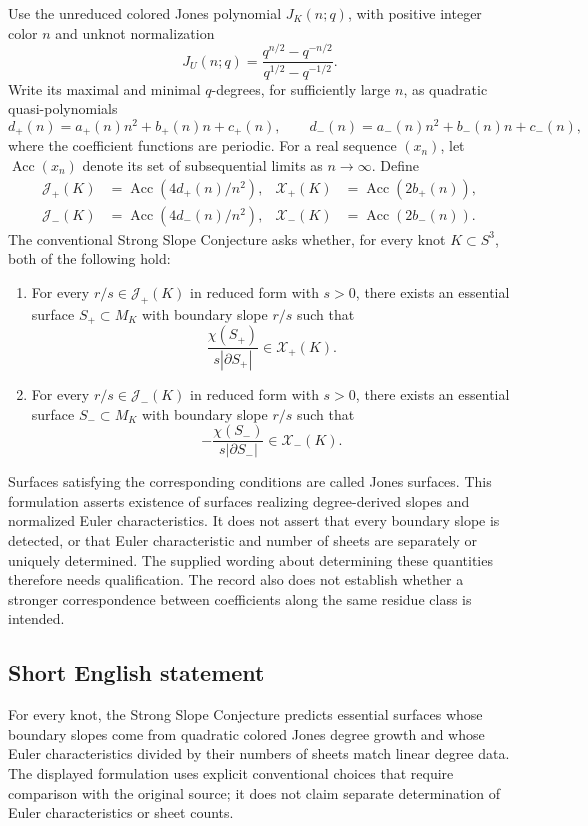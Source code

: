 \documentclass[11pt]{article}
\begin{document}
Use the unreduced colored Jones polynomial \(J_K(n;q)\), with positive integer color \(n\) and unknot normalization
\[
J_U(n;q)=\frac{q^{n/2}-q^{-n/2}}{q^{1/2}-q^{-1/2}}.
\]
Write its maximal and minimal \(q\)-degrees, for sufficiently large \(n\), as quadratic quasi-polynomials
\[
d_+(n)=a_+(n)n^2+b_+(n)n+c_+(n),\qquad
d_-(n)=a_-(n)n^2+b_-(n)n+c_-(n),
\]
where the coefficient functions are periodic. For a real sequence \((x_n)\), let \(\operatorname{Acc}(x_n)\) denote its set of subsequential limits as \(n\to\infty\). Define
\[
\begin{aligned}
\mathcal J_+(K)&=\operatorname{Acc}\!\left(4d_+(n)/n^2\right),&
\mathcal X_+(K)&=\operatorname{Acc}\!\left(2b_+(n)\right),\\
\mathcal J_-(K)&=\operatorname{Acc}\!\left(4d_-(n)/n^2\right),&
\mathcal X_-(K)&=\operatorname{Acc}\!\left(2b_-(n)\right).
\end{aligned}
\]
The conventional Strong Slope Conjecture asks whether, for every knot \(K\subset S^3\), both of the following hold:
\begin{enumerate}
\item For every \(r/s\in\mathcal J_+(K)\) in reduced form with \(s>0\), there exists an essential surface \(S_+\subset M_K\) with boundary slope \(r/s\) such that
\[
\frac{\chi(S_+)}{s|\partial S_+|}\in\mathcal X_+(K).
\]
\item For every \(r/s\in\mathcal J_-(K)\) in reduced form with \(s>0\), there exists an essential surface \(S_-\subset M_K\) with boundary slope \(r/s\) such that
\[
-\frac{\chi(S_-)}{s|\partial S_-|}\in\mathcal X_-(K).
\]
\end{enumerate}
Surfaces satisfying the corresponding conditions are called Jones surfaces. This formulation asserts existence of surfaces realizing degree-derived slopes and normalized Euler characteristics. It does not assert that every boundary slope is detected, or that Euler characteristic and number of sheets are separately or uniquely determined. The supplied wording about determining these quantities therefore needs qualification. The record also does not establish whether a stronger correspondence between coefficients along the same residue class is intended.
\subsection{Short English statement}
For every knot, the Strong Slope Conjecture predicts essential surfaces whose boundary slopes come from quadratic colored Jones degree growth and whose Euler characteristics divided by their numbers of sheets match linear degree data. The displayed formulation uses explicit conventional choices that require comparison with the original source; it does not claim separate determination of Euler characteristics or sheet counts.
\end{document}
